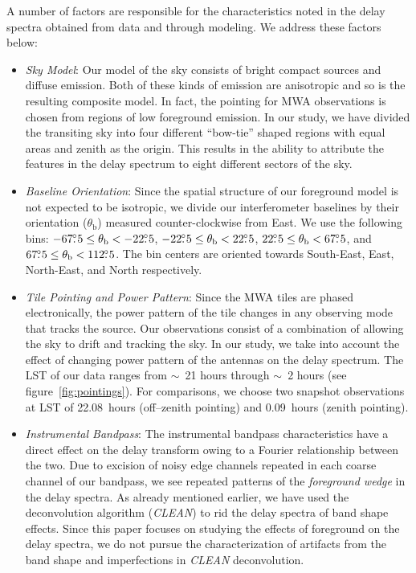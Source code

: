 \documentclass[preprint2,iop,numberedappendix]{emulateapj}
\begin{document}
A number of factors are responsible for the characteristics noted in the delay spectra obtained from data and through modeling. We address these factors below:
\begin{itemize}

\item {\it Sky Model}: Our model of the sky consists of bright compact sources and diffuse emission. Both of these kinds of emission are anisotropic and so is the resulting composite model. In fact, the pointing for MWA observations is chosen from regions of low foreground emission. In our study, we have divided the transiting sky into four different ``bow-tie'' shaped regions with equal areas and zenith as the origin. This results in the ability to attribute the features in the delay spectrum to eight different sectors of the sky.

\item {\it Baseline Orientation}: Since the spatial structure of our foreground model is not expected to be isotropic, we divide our interferometer baselines by their orientation ($\theta_\textrm{b}$) measured counter-clockwise from East. We use the following bins: $-67\mbox{$.\!\!^\circ$} 5\le \theta_\textrm{b} < -22\mbox{$.\!\!^\circ$} 5$, $-22\mbox{$.\!\!^\circ$} 5\le \theta_\textrm{b} < 22\mbox{$.\!\!^\circ$} 5$, $22\mbox{$.\!\!^\circ$} 5\le \theta_\textrm{b} < 67\mbox{$.\!\!^\circ$} 5$, and $67\mbox{$.\!\!^\circ$} 5\le \theta_\textrm{b} < 112\mbox{$.\!\!^\circ$} 5$. The bin centers are oriented towards South-East, East, North-East, and North respectively. 

\item {\it Tile Pointing and Power Pattern}: Since the MWA tiles are phased electronically, the power pattern of the tile changes in any observing mode that tracks the source. Our observations consist of a combination of allowing the sky to drift and tracking the sky. In our study, we take into account the effect of changing power pattern of the antennas on the delay spectrum. The LST of our data ranges from $\sim$~21 hours through $\sim$~2 hours (see figure~\ref{fig:pointings}). For comparisons, we choose two snapshot observations at LST of 22.08~hours (off--zenith pointing) and 0.09~hours (zenith pointing). 

\item {\it Instrumental Bandpass}: The instrumental bandpass characteristics have a direct effect on the delay transform owing to a Fourier relationship between the two. Due to excision of noisy edge channels repeated in each coarse channel of our bandpass, we see repeated patterns of the {\it foreground wedge} in the delay spectra. As already mentioned earlier, we have used the deconvolution algorithm ({\it CLEAN}) to rid the delay spectra of band shape effects. Since this paper focuses on studying the effects of foreground on the delay spectra, we do not pursue the characterization of artifacts from the band shape and imperfections in {\it CLEAN} deconvolution.

\end{itemize}
\end{document}
